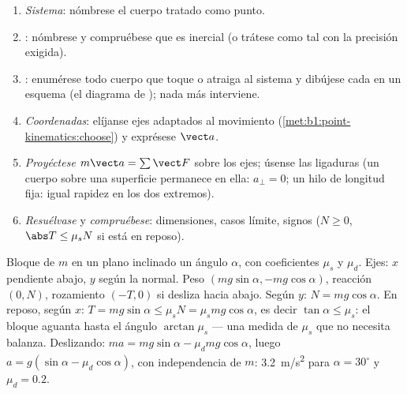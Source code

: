 \begin{method}\label{met:b1:newton-dynamics:method}
\begin{enumerate}
  \item \emph{Sistema}: nómbrese el cuerpo tratado como punto.
  \item \emph{}: nómbrese y compruébese que es
        inercial (o trátese como tal con la precisión exigida).
  \item \emph{}: enumérese todo cuerpo que toque o atraiga al
        sistema y dibújese cada  en un esquema (el diagrama de
        ); nada más interviene.
  \item \emph{Coordenadas}: elíjanse ejes adaptados al movimiento
        (\cref{met:b1:point-kinematics:choose}) y exprésese $\vect a$.
  \item \emph{Proyéctese} $m\vect a = \sum\vect F$ sobre los ejes; úsense
        las ligaduras (un cuerpo sobre una superficie permanece en ella:
        $a_\perp = 0$; un hilo de longitud fija: igual rapidez en los dos
        extremos).
  \item \emph{Resuélvase} y \emph{compruébese}: dimensiones, casos
        límite, signos ($N \geq 0$, $\abs T \leq \mu_sN$ si está en reposo).
\end{enumerate}
\end{method}

\begin{example}\label{ex:b1:newton-dynamics:incline}
Bloque de  $m$ en un plano inclinado un ángulo $\alpha$, con
coeficientes $\mu_s$ y $\mu_d$. Ejes: $x$ pendiente abajo, $y$ según la
normal. Peso $(mg\sin\alpha, -mg\cos\alpha)$, reacción $(0, N)$,
rozamiento $(-T, 0)$ si desliza hacia abajo. Según $y$: $N = mg\cos\alpha$.
En reposo, según $x$: $T = mg\sin\alpha \leq \mu_sN = \mu_smg\cos\alpha$,
es decir $\tan\alpha
\leq \mu_s$: el bloque aguanta hasta el ángulo $\arctan\mu_s$ --- una
medida de $\mu_s$ que no necesita balanza. Deslizando: $ma = mg\sin\alpha -
\mu_dmg\cos\alpha$, luego $a = g(\sin\alpha - \mu_d\cos\alpha)$, con
independencia de $m$: \qty{3.2}{m/s^2} para $\alpha = 30^\circ$ y $\mu_d = 0.2$.
\end{example}

